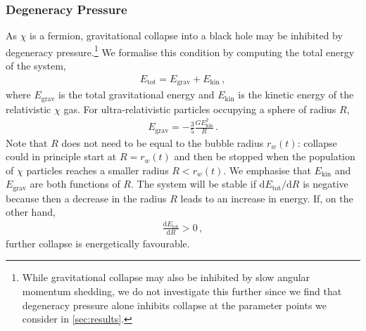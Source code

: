 \documentclass[
onecolumn, %
11pt, %
tightenlines,
superscriptaddress, %
nofootinbib, %
preprintnumbers, %
prd %
]{revtex4-1}
\newcommand{\td}[2]{\frac{\mathrm d #1}{\mathrm d #2}}                %
\newcommand{\upd}{\mathrm d}                                          %
\begin{document}
\subsubsection{Degeneracy Pressure}
\label{sec:degeneracy}

As $\chi$ is a fermion, gravitational collapse into a black hole may be inhibited by degeneracy pressure.\footnote{While gravitational collapse may also be inhibited by slow angular momentum shedding, we do not investigate this further since we find that degeneracy pressure alone inhibits collapse at the parameter points we consider in \cref{sec:results}.} We formalise this condition by computing the total energy of the system,
%
\begin{align}
    E_\text{tot} = E_\text{grav} + E_\text{kin} \,,
\end{align}
%
where $E_\text{grav}$ is the total gravitational energy and $E_\text{kin}$ is the kinetic energy of the relativistic $\chi$ gas.  For ultra-relativistic particles occupying a sphere of radius $R$,
%
\begin{align}
    E_\text{grav} = -\frac{3}{5} \frac{G E_\text{kin}^2}{R} \,.
\end{align}
%
Note that $R$ does not need to be equal to the bubble radius $r_w(t)$: collapse could in principle start at $R = r_w(t)$ and then be stopped when the population of $\chi$ particles reaches a smaller radius $R < r_w(t)$.  We emphasise that $E_\text{kin}$ and $E_\text{grav}$ are both functions of $R$.  The system will be stable if $\upd E_\text{tot} / \upd R$ is negative because then a decrease in the radius $R$ leads to an increase in energy. If, on the other hand,
%
\begin{align}
    \td{E_\text{tot}}{R} > 0 \,,
\end{align}
%
further collapse is energetically favourable.
\end{document}
